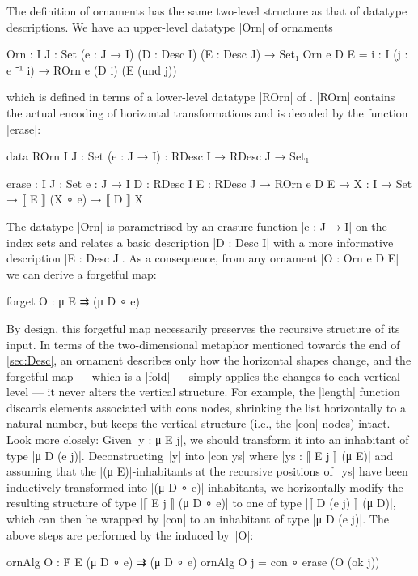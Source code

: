 The definition of ornaments has the same two-level structure as that of datatype descriptions.
We have an upper-level datatype |Orn| of ornaments
\begin{code}
Orn : {I J : Set} (e : J → I) (D : Desc I) (E : Desc J) → Set₁
Orn e D E = {i : I} (j : e ⁻¹ i) → ROrn e (D i) (E (und j))
\end{code}
which is defined in terms of a lower-level datatype |ROrn| of .
|ROrn| contains the actual encoding of horizontal transformations and is decoded by the function |erase|:
\begin{code}
data ROrn {I J : Set} (e : J → I) : RDesc I → RDesc J → Set₁
           
erase :  {I J : Set} {e : J → I} {D : RDesc I} {E : RDesc J} →
         ROrn e D E → {X : I → Set} → ⟦ E ⟧ (X ∘ e) → ⟦ D ⟧ X
\end{code}
The datatype |Orn| is parametrised by an erasure function |e : J → I| on the index sets and relates a basic description |D : Desc I| with a more informative description |E : Desc J|.
As a consequence, from any ornament |O : Orn e D E| we can derive a forgetful map:
\begin{spec}
forget O : μ E ⇉ (μ D ∘ e)
\end{spec}
By design, this forgetful map necessarily preserves the recursive structure of its input.
In terms of the two-dimensional metaphor mentioned towards the end of \autoref{sec:Desc}, an ornament describes only how the horizontal shapes change, and the forgetful map --- which is a |fold| --- simply applies the changes to each vertical level --- it never alters the vertical structure.
For example, the |length| function discards elements associated with cons nodes, shrinking the list horizontally to a natural number, but keeps the vertical structure (i.e., the |con| nodes) intact.
Look more closely:
Given |y : μ E j|, we should transform it into an inhabitant of type |μ D (e j)|.
Deconstructing~|y| into |con ys| where |ys : ⟦ E j ⟧ (μ E)| and assuming that the |(μ E)|-inhabitants at the recursive positions of~|ys| have been inductively transformed into |(μ D ∘ e)|-inhabitants, we horizontally modify the resulting structure of type |⟦ E j ⟧ (μ D ∘ e)| to one of type |⟦ D (e j) ⟧ (μ D)|, which can then be wrapped by |con| to an inhabitant of type |μ D (e j)|.
The above steps are performed by the  induced by~|O|:
\begin{code}
ornAlg O : Ḟ E (μ D ∘ e) ⇉ (μ D ∘ e)
ornAlg O {j} = con ∘ erase (O (ok j))
\end{code}
